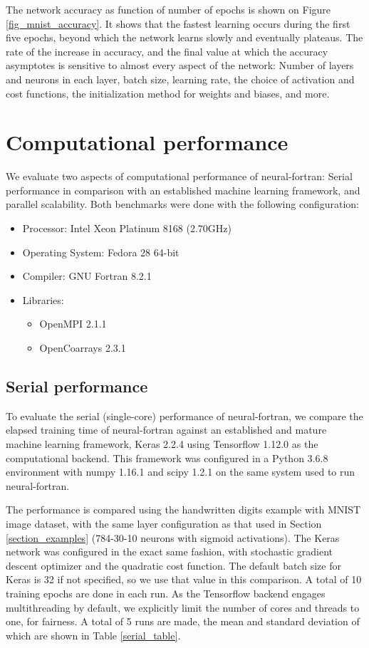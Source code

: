 \documentclass[sigplan, review=false, screen=true, balance=true]{acmart}
\begin{document}
The network accuracy as function of number of epochs is shown on Figure
\ref{fig_mnist_accuracy}. It shows that the fastest learning occurs during
the first five epochs, beyond which the network learns slowly and eventually
plateaus.
The rate of the increase in accuracy, and the final value at which the accuracy
asymptotes is sensitive to almost every aspect of the network:
Number of layers and neurons in each layer, batch size,
learning rate, the choice of activation and cost functions, the initialization
method for weights and biases, and more.

\section{Computational performance} \label{section_performance}

We evaluate two aspects of computational performance of neural-fortran:
Serial performance in comparison with an established machine learning framework,
and parallel scalability. Both benchmarks were done with the following
configuration:

\begin{itemize}
  \item Processor: Intel Xeon Platinum 8168 (2.70GHz)
  \item Operating System: Fedora 28 64-bit
  \item Compiler: GNU Fortran 8.2.1
  \item Libraries:
  \begin{itemize}
    \item OpenMPI 2.1.1
    \item OpenCoarrays 2.3.1 \citep{fanfarillo14}
  \end{itemize}
\end{itemize}

\subsection{Serial performance}

To evaluate the serial (single-core) performance of neural-fortran,
we compare the elapsed training time of neural-fortran against an established
and mature machine learning framework, Keras 2.2.4 \citep{chollet15} using
Tensorflow 1.12.0 \citep{abadi16} as the computational backend. This framework
was configured in a Python 3.6.8 environment with numpy 1.16.1 and scipy 1.2.1
on the same system used to run neural-fortran.

The performance is compared using the handwritten digits example
with MNIST image dataset, with the same layer configuration as that used
in Section \ref{section_examples} (784-30-10 neurons with sigmoid activations).
The Keras network was configured in the exact same fashion, with stochastic
gradient descent optimizer and the quadratic cost function. The default batch
size for Keras is 32 if not specified, so we use that value in this comparison.
A total of 10 training epochs are done in each run.
As the Tensorflow backend engages multithreading by default, we explicitly
limit the number of cores and threads to one, for fairness.
A total of 5 runs are made, the mean and standard deviation of which are shown
in Table \ref{serial_table}.
\end{document}
